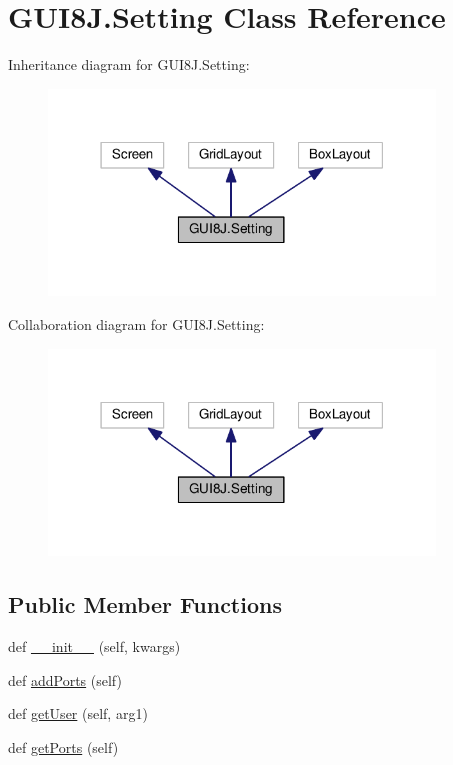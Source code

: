\hypertarget{classGUI8J_1_1Setting}{}\section{G\+U\+I8\+J.\+Setting Class Reference}
\label{classGUI8J_1_1Setting}


Inheritance diagram for G\+U\+I8\+J.\+Setting\+:\nopagebreak
\begin{figure}[H]
\begin{center}
\leavevmode
\includegraphics[width=291pt]{classGUI8J_1_1Setting__inherit__graph}
\end{center}
\end{figure}


Collaboration diagram for G\+U\+I8\+J.\+Setting\+:\nopagebreak
\begin{figure}[H]
\begin{center}
\leavevmode
\includegraphics[width=291pt]{classGUI8J_1_1Setting__coll__graph}
\end{center}
\end{figure}
\subsection*{Public Member Functions}
\begin{DoxyCompactItemize}
\item 
def \hyperlink{classGUI8J_1_1Setting_a118bbfa6da2c767281df5be11f562fff}{\+\_\+\+\_\+init\+\_\+\+\_\+} (self, kwargs)
\item 
def \hyperlink{classGUI8J_1_1Setting_a4f425d03b5c2b8273f01d7e09c3d70bd}{add\+Ports} (self)
\item 
def \hyperlink{classGUI8J_1_1Setting_aa6e419c4232c52e7bbd58276a8cef4d6}{get\+User} (self, arg1)
\item 
def \hyperlink{classGUI8J_1_1Setting_a028d38da60e64282789abd3a806b63d1}{get\+Ports} (self)
\end{DoxyCompactItemize}
